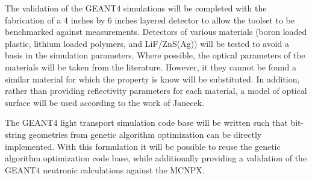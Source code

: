 The validation of the GEANT4 simulations will be completed with the fabrication of a 4 inches by 6 inches layered detector to allow the toolset to be benchmarked against measurements.
Detectors of various materials (boron loaded plastic, lithium loaded polymers, and LiF/ZnS(Ag)) will be tested to avoid a basis in the simulation parameters.
Where possible, the optical parameters of the materials will be taken from the literature.
However, it they cannot be found a similar material for which the property is know will be substituted.
In addition, rather than providing reflectivity parameters for each material, a model of optical surface will be used according to the work of Janecek\cite{5485130}. 

The GEANT4 light transport simulation code base will be written such that bit-string geometries from genetic algorithm optimization can be directly implemented.
With this formulation it will be possible to reuse the genetic algorithm optimization code base, while additionally providing a validation of the GEANT4 neutronic calculations against the MCNPX.
